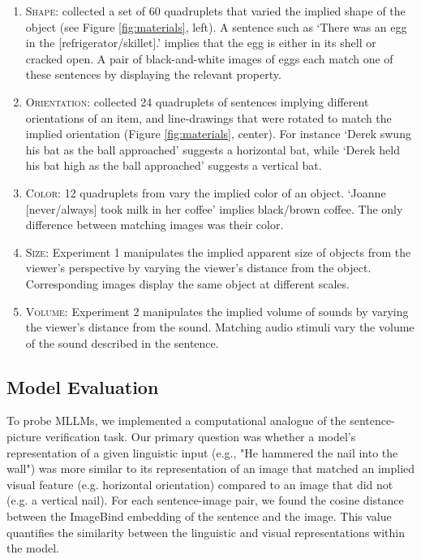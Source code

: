 \documentclass[11pt]{article}
\begin{document}
\begin{enumerate}

    \item \textsc{Shape}: %
    \citet{pecher2009short} collected a set of 60 quadruplets that varied the implied shape of the object (see Figure \ref{fig:materials}, left). A sentence such as `There was an egg in the [refrigerator/skillet].' implies that the egg is either in its shell or cracked open. A pair of black-and-white images of eggs each match one of these sentences by displaying the relevant property.

    \item \textsc{Orientation}: %
    \citet{stanfield2001effect} collected 24 quadruplets of sentences implying different orientations of an item, and line-drawings that were rotated to match the implied orientation (Figure \ref{fig:materials}, center). For instance `Derek swung his bat as the ball approached' suggests a horizontal bat, while `Derek held his bat high as the ball approached' suggests a vertical bat.

    \item \textsc{Color}:
    12 quadruplets from \citet{connell2007representing} vary the implied color of an object. `Joanne [never/always] took milk in her coffee' implies black/brown coffee. The only difference between matching images was their color.

    \item \textsc{Size}: \citet{winter2012language} Experiment 1 manipulates the implied apparent size of objects from the viewer's perspective by varying the viewer's distance from the object.
    Corresponding images display the same object at different scales.

    \item \textsc{Volume}: \citet{winter2012language} Experiment 2 manipulates the implied volume of sounds by varying the viewer's distance from the sound.
    Matching audio stimuli vary the volume of the sound described in the sentence.



\end{enumerate}


\subsection{Model Evaluation}

To probe MLLMs, we implemented a computational analogue of the sentence-picture verification task. Our primary question was whether a model's representation of a given linguistic input (e.g., "He hammered the nail into the wall") was more similar to its representation of an image that matched an implied visual feature (e.g. horizontal orientation) compared to an image that did not (e.g. a vertical nail).
For each sentence-image pair, we found the cosine distance between the ImageBind embedding of the sentence and the image. This value quantifies the similarity between the linguistic and visual representations within the model.
\end{document}

